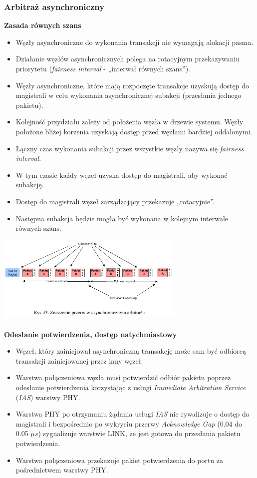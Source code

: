 \subsubsection{Arbitraż asynchroniczny}
\textbf{Zasada równych szans}
\begin{itemize}
	\item Węzły asynchroniczne do wykonania transakcji nie wymagają alokacji pasma.
	\item Działanie węzłów asynchronicznych polega na rotacyjnym przekazywaniu priorytetu (\emph{fairness interval} - „interwał równych szans”).
	\item Węzły asynchroniczne, które mają rozpoczęte transakcje uzyskują dostęp do magistrali w celu wykonania asynchronicznej subakcji (przesłania jednego pakietu).
	\item Kolejność przydziału zależy od położenia węzła w drzewie systemu. Węzły położone bliżej korzenia uzyskają dostęp przed węzłami bardziej oddalonymi.
	\item Łączny czas wykonania subakcji przez wszystkie węzły nazywa się \emph{fairness interval}.
	\item W tym czasie każdy węzeł uzyska dostęp do magistrali, aby wykonać subakcję.
	\item Dostęp do magistrali węzeł zarządzający przekazuje „rotacyjnie”.
	\item Następna subakcja będzie mogła być wykonana w kolejnym interwale równych szans.
\end{itemize}
\includegraphics[width=9cm]{./wyklady/FIREWIRE_40_1.pdf}\\\\
\textbf{Odesłanie potwierdzenia, dostęp natychmiastowy}
\begin{itemize}
	\item Węzeł, który zainicjował asynchroniczną transakcję może sam być odbiorcą transakcji zainicjowanej przez inny węzeł.
	\item Warstwa połączeniowa węzła musi potwierdzić odbiór pakietu poprzez odesłanie potwierdzenia korzystając z usługi \emph{Immediate Arbitration Service} (\emph{IAS}) warstwy PHY.
	\item Warstwa PHY po otrzymaniu żądania usługi \emph{IAS} nie rywalizuje o dostęp do magistrali i bezpośrednio po wykryciu przerwy \emph{Acknowledge Gap} (0.04 do 0.05 $\mu{s}$) sygnalizuje warstwie LINK, że jest gotowa do przesłania pakietu potwierdzenia.
	\item Warstwa połączeniowa przekazuje pakiet potwierdzenia do portu za pośrednictwem warstwy PHY.
\end{itemize}
